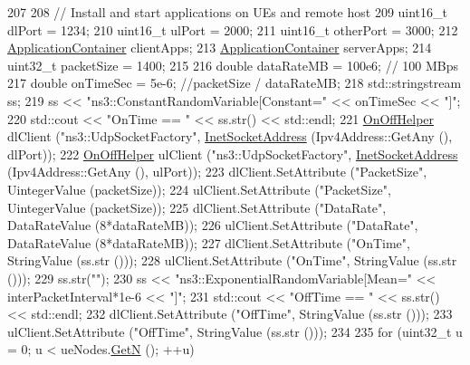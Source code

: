 \begin{DoxyCode}
207 
208         \textcolor{comment}{// Install and start applications on UEs and remote host}
209         uint16\_t dlPort = 1234;
210         uint16\_t ulPort = 2000;
211         uint16\_t otherPort = 3000;
212         \hyperlink{classns3_1_1ApplicationContainer}{ApplicationContainer} clientApps;
213         \hyperlink{classns3_1_1ApplicationContainer}{ApplicationContainer} serverApps;
214         uint32\_t packetSize = 1400;
215 
216         \textcolor{keywordtype}{double} dataRateMB = 100e6;  \textcolor{comment}{// 100 MBps}
217         \textcolor{keywordtype}{double} onTimeSec = 5e-6; \textcolor{comment}{//packetSize / dataRateMB;}
218         std::stringstream ss;
219         ss << \textcolor{stringliteral}{"ns3::ConstantRandomVariable[Constant="} << onTimeSec << \textcolor{stringliteral}{"]"};
220         std::cout << \textcolor{stringliteral}{"OnTime == "} << ss.str() << std::endl;
221         \hyperlink{classns3_1_1OnOffHelper}{OnOffHelper} dlClient (\textcolor{stringliteral}{"ns3::UdpSocketFactory"}, 
      \hyperlink{classns3_1_1InetSocketAddress}{InetSocketAddress} (Ipv4Address::GetAny (), dlPort));
222         \hyperlink{classns3_1_1OnOffHelper}{OnOffHelper} ulClient (\textcolor{stringliteral}{"ns3::UdpSocketFactory"}, 
      \hyperlink{classns3_1_1InetSocketAddress}{InetSocketAddress} (Ipv4Address::GetAny (), ulPort));
223         dlClient.SetAttribute (\textcolor{stringliteral}{"PacketSize"}, UintegerValue (packetSize));
224         ulClient.SetAttribute (\textcolor{stringliteral}{"PacketSize"}, UintegerValue (packetSize));
225         dlClient.SetAttribute (\textcolor{stringliteral}{"DataRate"}, DataRateValue (8*dataRateMB));
226         ulClient.SetAttribute (\textcolor{stringliteral}{"DataRate"}, DataRateValue (8*dataRateMB));
227         dlClient.SetAttribute (\textcolor{stringliteral}{"OnTime"}, StringValue (ss.str ()));
228         ulClient.SetAttribute (\textcolor{stringliteral}{"OnTime"}, StringValue (ss.str ()));
229         ss.str(\textcolor{stringliteral}{""});
230         ss << \textcolor{stringliteral}{"ns3::ExponentialRandomVariable[Mean="} << interPacketInterval*1e-6 << \textcolor{stringliteral}{"]"};
231         std::cout << \textcolor{stringliteral}{"OffTime == "} << ss.str() << std::endl;
232         dlClient.SetAttribute (\textcolor{stringliteral}{"OffTime"}, StringValue (ss.str ()));
233         ulClient.SetAttribute (\textcolor{stringliteral}{"OffTime"}, StringValue (ss.str ()));
234 
235         \textcolor{keywordflow}{for} (uint32\_t u = 0; u < ueNodes.\hyperlink{classns3_1_1NodeContainer_aed647ac56d0407a7706aba02eb44b951}{GetN} (); ++u)

\end{DoxyCode}
